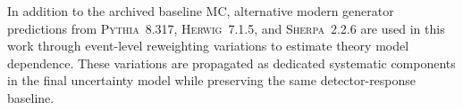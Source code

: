 In addition to the archived baseline MC, alternative modern generator predictions from \textsc{Pythia}~8.317, \textsc{Herwig}~7.1.5, and \textsc{Sherpa}~2.2.6 are used in this work through event-level reweighting variations to estimate theory model dependence. These variations are propagated as dedicated systematic components in the final uncertainty model while preserving the same detector-response baseline.
